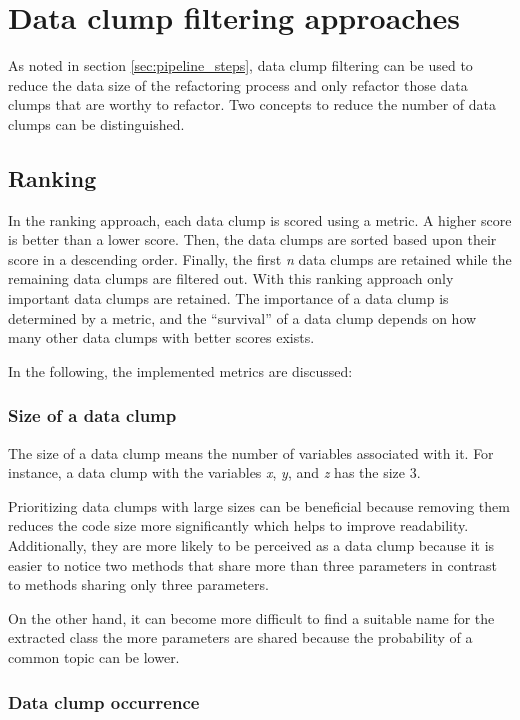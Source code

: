 \section{Data clump filtering approaches}
\label{sec:data_clump_filtering}

As noted in section \ref{sec:pipeline_steps}, data clump filtering can be used to reduce the data size of the refactoring process and only refactor those data clumps that are worthy to refactor. Two concepts to  reduce the number of data clumps can be distinguished.
\subsection{Ranking} \label{sec:metrics}
In the ranking approach, each data clump is scored using a metric. A higher score is better than a lower score.  Then, the data clumps are sorted based upon their score in a descending order. Finally, the first  \textit{n} data clumps are retained while the remaining data clumps are filtered out. With this ranking approach only important data clumps are retained. The importance of a data clump is determined by a metric, and the \enquote{survival} of a data clump depends on how many other data clumps with better scores exists.

In the following, the implemented metrics are discussed:

\subsubsection{Size of a data clump}

The size of a data clump means the number of variables associated with it. For instance, a data clump with the variables \textit{x}, \textit{y}, and \textit{z} has the size 3. 

Prioritizing data clumps with large sizes can be beneficial because removing them reduces the code size more significantly which helps to improve readability. Additionally, they are more likely to be perceived as a data clump because it is easier to notice two methods that share more than three parameters in contrast to methods sharing only three parameters. 

On the other hand,  it can become more difficult to find a suitable name for the extracted class the more parameters are shared because the probability of a common topic can be lower. 

\subsubsection{ Data clump occurrence}

